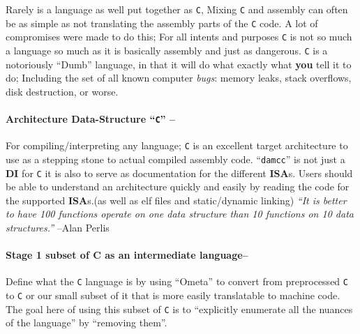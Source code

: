 Rarely is a language as well put together as \texttt{C}, Mixing
\texttt{C} and assembly can often be as simple as not translating the
assembly parts of the \texttt{C} code. A lot of compromises were made to
do this; For all intents and purposes \texttt{C} is not so much a
language so much as it is basically assembly and just as dangerous.
\texttt{C} is a notoriously ``Dumb'' language, in that it will do what
exactly what \textbf{you} tell it to do; Including the set of all known
computer \emph{bugs}: memory leaks, stack overflows, disk destruction,
or worse.

\hypertarget{architecture-data-structure-c}{%
\paragraph{\texorpdfstring{Architecture Data-Structure ``\texttt{C}''
--}{Architecture Data-Structure ``C'' --}}\label{architecture-data-structure-c}}

For compiling/interpreting any language; \texttt{C} is an excellent
target architecture to use as a stepping stone to actual compiled
assembly code. ``\texttt{damcc}'' is not just a \textbf{DI} for
\texttt{C} it is also to serve as documentation for the different
\textbf{ISA}s. Users should be able to understand an architecture
quickly and easily by reading the code for the supported
\textbf{ISA}s.(as well as elf files and static/dynamic linking)
\emph{``It is better to have 100 functions operate on one data structure
than 10 functions on 10 data structures.''} --Alan Perlis

\hypertarget{stage-1-subset-of-c-as-an-intermediate-language}{%
\paragraph{Stage 1 subset of C as an intermediate
language--}\label{stage-1-subset-of-c-as-an-intermediate-language}}

Define what the \texttt{C} language is by using ``Ometa'' to convert
from preprocessed \texttt{C} to \texttt{C} or our small subset of it
that is more easily translatable to machine code. The goal here of using
this subset of \texttt{C} is to ``explicitly enumerate all the nuances
of the language'' by ``removing them''.

